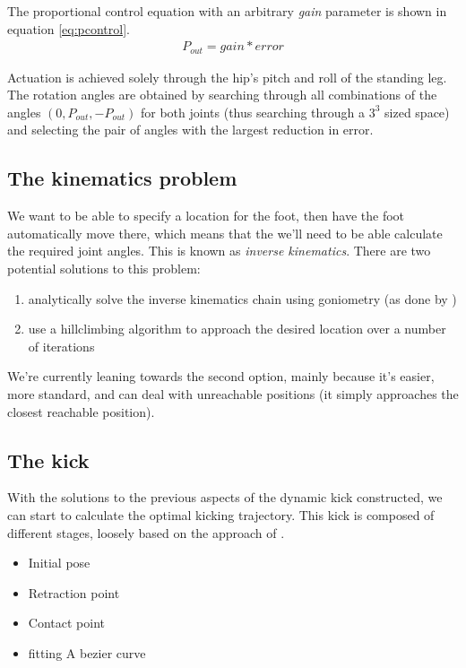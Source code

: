 \documentclass[a4paper]{article}
\begin{document}
The proportional control equation with an arbitrary \emph{gain} parameter is
shown in equation \ref{eq:pcontrol}.
\begin{align}
	P_{out} = gain * error 				\label{eq:pcontrol}
\end{align}

Actuation is achieved solely through the hip's pitch and roll of the standing leg.
The rotation angles are obtained by searching through all combinations of the angles
$(0, P_{out}, -P_{out})$ for both joints (thus searching through a $3^3$ sized space)
and selecting the pair of angles with the largest reduction in error.

\subsection{The kinematics problem}
We want to be able to specify a location for the foot, then have the foot
automatically move there, which means that the we'll need to be able calculate
the required joint angles. This is known as \emph{inverse kinematics}. There are
two potential solutions to this problem:
\begin{enumerate}
  \item analytically solve the inverse kinematics chain using goniometry (as done by \cite{Graf2009})
\item use a hillclimbing algorithm to approach the desired location over a number of iterations
\end{enumerate}

We're currently leaning towards the second option, mainly because it’s easier,
more standard, and can deal with unreachable positions (it simply approaches the
closest reachable position).

\subsection{The kick}
With the solutions to the previous aspects of the dynamic kick constructed, 
we can start to calculate the optimal kicking trajectory. This kick is composed
of different stages, loosely based on the approach of \cite{Xu2010}.
\begin{itemize}
    \item Initial pose
    \item Retraction point
    \item Contact point
    \item fitting A bezier curve
\end{itemize}
\end{document}
